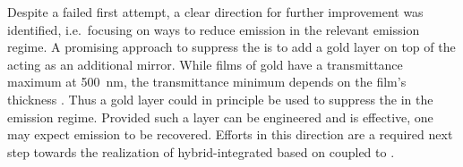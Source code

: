 		Despite a failed first attempt, a clear direction for further improvement was identified, i.e.\ focusing on ways to reduce \VCSEL \sb emission in the relevant \siv emission regime. A promising approach to suppress the \sb is to add a gold layer on top of the \VCSEL acting as an additional mirror. While films of gold have a transmittance maximum at \SI{500}{nm}, the transmittance minimum depends on the film's thickness \cite{Axelevitch2012}. Thus a gold layer could in principle be used to suppress the \VCSEL \sb in the \siv emission regime. Provided such a layer can be engineered and is effective, one may expect \siv emission to be recovered. Efforts in this direction are a required next step towards the realization of hybrid-integrated \spss based on \sivs coupled to \VCSELs.
